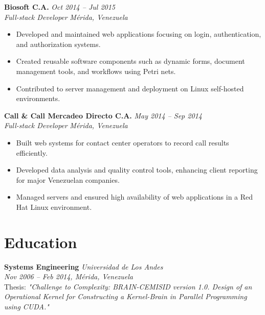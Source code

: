 \documentclass[a4paper,10pt]{article}
\begin{document}
\textbf{Biosoft C.A.} \hfill \textit{Oct 2014 -- Jul 2015}\\
\textit{Full-stack Developer} \hfill \textit{Mérida, Venezuela}\\
\begin{itemize}[leftmargin=0.5cm, topsep=0pt, parsep=0pt, itemsep=2pt]
	\item Developed and maintained web applications focusing on login,
	      authentication, and authorization systems.
	\item Created reusable software components such as dynamic forms, document
	      management tools, and workflows using Petri nets.
	\item Contributed to server management and deployment on Linux self-hosted
	      environments.
\end{itemize}

\textbf{Call \& Call Mercadeo Directo C.A.} \hfill \textit{May 2014 -- Sep 2014}\\
\textit{Full-stack Developer} \hfill \textit{Mérida, Venezuela}\\
\begin{itemize}[leftmargin=0.5cm, topsep=0pt, parsep=0pt, itemsep=2pt]
	\item Built web systems for contact center operators to record call results
	      efficiently.
	\item Developed data analysis and quality control tools, enhancing client
	      reporting for major Venezuelan companies.
	\item Managed servers and ensured high availability of web applications in
	      a Red Hat Linux environment.
\end{itemize}

\section*{Education}
\sectionline
\textbf{Systems Engineering} \hfill \textit{Universidad de Los Andes}\\
\textit{Nov 2006 -- Feb 2014, Mérida, Venezuela}\\
Thesis: \textit{"Challenge to Complexity: BRAIN-CEMISID version 1.0. Design of
	an Operational Kernel for Constructing a Kernel-Brain in Parallel Programming
	using CUDA."}
\end{document}
